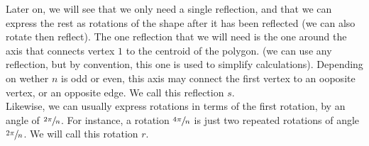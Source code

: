\documentclass[12pt]{article}
\begin{document}
    Later on, we will see that we only need a single reflection,
    and that we can express the rest as rotations of the shape
    after it has been reflected (we can also rotate then reflect). 
    The one reflection that we will need is the one around the axis
    that connects vertex $1$ to the centroid of the polygon.
    (we can use any reflection, but by convention,
    this one is used to simplify calculations). 
    Depending on wether $n$ is odd or even,
    this axis may connect the first vertex to an ooposite vertex,
    or an opposite edge.
    We call this reflection $s$. \\ 
    Likewise, we can usually express rotations in terms of the 
    first rotation, by an angle of $\sfrac{2\pi}{n}$.
    For instance, a rotation $\sfrac{4\pi}{n}$
    is just two repeated rotations of angle $\sfrac{2\pi}{n}$.
    We will call this rotation $r$. \\
\end{document}
